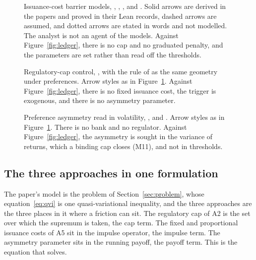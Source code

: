 \begin{landscape}
\begin{figure}[p]
\centering
{}
\caption{Issuance-cost barrier models, \citet{peura2006},
\citet{daihuangkeppo2019}, \citet{bolton2011}, \citet{lokka2008} and
\citet{milnewhalley2001}. Solid arrows are derived in the papers and proved in
their Lean records, dashed arrows are assumed, and dotted arrows are stated in
words and not modelled. The analyst is not an agent of the models. Against
Figure~\ref{fig:ledger}, there is no cap and no graduated penalty, and the
parameters are set rather than read off the thresholds.}
\label{fig:ledger-issuance}
\end{figure}

\begin{figure}[p]
\centering
{}
\caption{Regulatory-cap control, \citet{bayraktar2026}, with the rule of
\citet{blackperold1992} as the same geometry under preferences. Arrow styles as
in Figure~\ref{fig:ledger-issuance}. Against Figure~\ref{fig:ledger}, there is
no fixed issuance cost, the trigger is exogenous, and there is no asymmetry
parameter.}
\label{fig:ledger-cap}
\end{figure}

\begin{figure}[p]
\centering
{}
\caption{Preference asymmetry read in volatility, \citet{barberis2001},
\citet{li2023} and \citet{engle2018}. Arrow styles as in
Figure~\ref{fig:ledger-issuance}. There is no bank and no regulator. Against
Figure~\ref{fig:ledger}, the asymmetry is sought in the variance of returns,
which a binding cap closes (M11), and not in thresholds.}
\label{fig:ledger-preference}
\end{figure}
\end{landscape}

\subsection{The three approaches in one formulation}
\label{sec:common}

The paper's model is the problem of Section~\ref{sec:problem}, whose
equation~\eqref{eq:qvi} is one quasi-variational inequality, and the three
approaches are the three places in it where a friction can sit. The regulatory cap
of A2 is the set over which the supremum is taken, the cap term. The fixed and
proportional issuance costs of A5 sit in the impulse operator, the impulse
term. The asymmetry parameter sits in the running payoff, the payoff term.
This is the equation that  solves.

